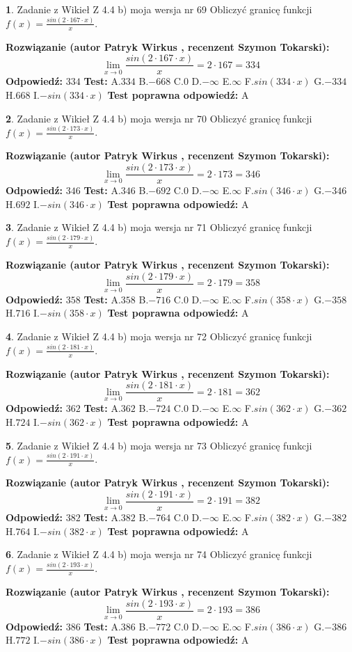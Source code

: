 \documentclass[12pt, a4paper]{article}
\theoremstyle{definition} %
\newtheorem{zad}{}
\newcommand{\zadStart}[1]{\begin{zad}#1\newline}
\newcommand{\zadStop}{\end{zad}}
\newcommand{\rozwStart}[2]{\noindent \textbf{Rozwiązanie (autor #1 , recenzent #2): }\newline}
\newcommand{\rozwStop}{\newline}
\newcommand{\odpStart}{\noindent \textbf{Odpowiedź:}\newline}
\newcommand{\odpStop}{\newline}
\newcommand{\testStart}{\noindent \textbf{Test:}\newline}
\newcommand{\testStop}{\newline}
\newcommand{\kluczStart}{\noindent \textbf{Test poprawna odpowiedź:}\newline}
\newcommand{\kluczStop}{\newline}
\begin{document}
\zadStart{Zadanie z Wikieł Z 4.4 b) moja wersja nr 69}
Obliczyć granicę funkcji $f(x)=\frac{sin(2 \cdot167\cdot x)}{x}$.
\zadStop
\rozwStart{Patryk Wirkus}{Szymon Tokarski}
$$\lim\limits_{x\to 0}\frac{sin(2 \cdot 167\cdot x)}{x}=
2 \cdot 167 = 334$$
\rozwStop
\odpStart
$334$
\odpStop
\testStart
A.$334$
B.$-668$
C.$0$
D.$-\infty$
E.$\infty$
F.$sin(334\cdot x)$
G.$-334$
H.$668$
I.$-sin(334\cdot x)$
\testStop
\kluczStart
A
\kluczStop



\zadStart{Zadanie z Wikieł Z 4.4 b) moja wersja nr 70}
Obliczyć granicę funkcji $f(x)=\frac{sin(2 \cdot173\cdot x)}{x}$.
\zadStop
\rozwStart{Patryk Wirkus}{Szymon Tokarski}
$$\lim\limits_{x\to 0}\frac{sin(2 \cdot 173\cdot x)}{x}=
2 \cdot 173 = 346$$
\rozwStop
\odpStart
$346$
\odpStop
\testStart
A.$346$
B.$-692$
C.$0$
D.$-\infty$
E.$\infty$
F.$sin(346\cdot x)$
G.$-346$
H.$692$
I.$-sin(346\cdot x)$
\testStop
\kluczStart
A
\kluczStop



\zadStart{Zadanie z Wikieł Z 4.4 b) moja wersja nr 71}
Obliczyć granicę funkcji $f(x)=\frac{sin(2 \cdot179\cdot x)}{x}$.
\zadStop
\rozwStart{Patryk Wirkus}{Szymon Tokarski}
$$\lim\limits_{x\to 0}\frac{sin(2 \cdot 179\cdot x)}{x}=
2 \cdot 179 = 358$$
\rozwStop
\odpStart
$358$
\odpStop
\testStart
A.$358$
B.$-716$
C.$0$
D.$-\infty$
E.$\infty$
F.$sin(358\cdot x)$
G.$-358$
H.$716$
I.$-sin(358\cdot x)$
\testStop
\kluczStart
A
\kluczStop



\zadStart{Zadanie z Wikieł Z 4.4 b) moja wersja nr 72}
Obliczyć granicę funkcji $f(x)=\frac{sin(2 \cdot181\cdot x)}{x}$.
\zadStop
\rozwStart{Patryk Wirkus}{Szymon Tokarski}
$$\lim\limits_{x\to 0}\frac{sin(2 \cdot 181\cdot x)}{x}=
2 \cdot 181 = 362$$
\rozwStop
\odpStart
$362$
\odpStop
\testStart
A.$362$
B.$-724$
C.$0$
D.$-\infty$
E.$\infty$
F.$sin(362\cdot x)$
G.$-362$
H.$724$
I.$-sin(362\cdot x)$
\testStop
\kluczStart
A
\kluczStop



\zadStart{Zadanie z Wikieł Z 4.4 b) moja wersja nr 73}
Obliczyć granicę funkcji $f(x)=\frac{sin(2 \cdot191\cdot x)}{x}$.
\zadStop
\rozwStart{Patryk Wirkus}{Szymon Tokarski}
$$\lim\limits_{x\to 0}\frac{sin(2 \cdot 191\cdot x)}{x}=
2 \cdot 191 = 382$$
\rozwStop
\odpStart
$382$
\odpStop
\testStart
A.$382$
B.$-764$
C.$0$
D.$-\infty$
E.$\infty$
F.$sin(382\cdot x)$
G.$-382$
H.$764$
I.$-sin(382\cdot x)$
\testStop
\kluczStart
A
\kluczStop



\zadStart{Zadanie z Wikieł Z 4.4 b) moja wersja nr 74}
Obliczyć granicę funkcji $f(x)=\frac{sin(2 \cdot193\cdot x)}{x}$.
\zadStop
\rozwStart{Patryk Wirkus}{Szymon Tokarski}
$$\lim\limits_{x\to 0}\frac{sin(2 \cdot 193\cdot x)}{x}=
2 \cdot 193 = 386$$
\rozwStop
\odpStart
$386$
\odpStop
\testStart
A.$386$
B.$-772$
C.$0$
D.$-\infty$
E.$\infty$
F.$sin(386\cdot x)$
G.$-386$
H.$772$
I.$-sin(386\cdot x)$
\testStop
\kluczStart
A
\kluczStop
\end{document}
